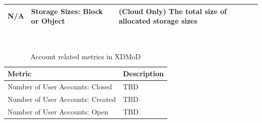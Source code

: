 \documentclass{sig-alternate-05-2015}
\begin{document}
\begin{table}[htb]
\begin{scriptsize}
\begin{tabular}{l|l|l}
N/A & Storage Sizes: Block or Object & (Cloud Only) The total size of allocated storage sizes \\
\hline
\end{tabular}\\
\end{scriptsize}
\end{table}


\begin{table}[htb]
  \caption{Account related metrics in XDMoD}
\begin{scriptsize}
\label{T:xdmod22}
 \begin{tabular}{l|l} 
Metric & Description \\
\hline
Number of User Accounts: Closed & TBD \\
Number of User Accounts: Created & TBD \\
Number of User Accounts: Open & TBD \\
\hline
\end{tabular}\\
\end{scriptsize}
\end{table}
\end{document}
